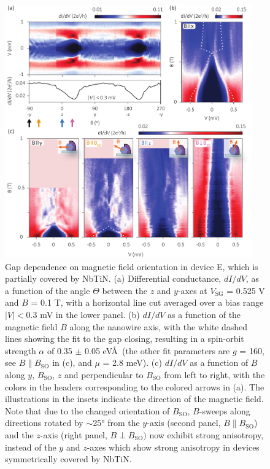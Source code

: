 \begin{figure}[p!]
\centering
\includegraphics[width=0.95\textwidth]{chapter_spinorbit/figures/SFig6_Bsweeps_half.pdf}
\caption{\label{fig:BsweepsHalf}
Gap dependence on magnetic field orientation in device E, which is partially covered by NbTiN.
(a) Differential conductance, $dI/dV$, as a function of the angle $\Theta$ between the $z$ and $y$-axes at $V_{\mathrm{SG}}$ = 0.525 V and $B$ = 0.1 T, with a horizontal line cut averaged over a bias range $|V| < 0.3$ mV in the lower panel.
(b) $dI/dV$ as a function of the magnetic field $B$ along the nanowire axis, with the white dashed lines showing the fit to the gap closing, resulting in a spin-orbit strength $\alpha$ of 0.35 $\pm$ 0.05 eV\AA\ (the other fit parameters are $g$ = 160, see $B \parallel B_{\mathrm{SO}}$ in (c), and $\mu$ = 2.8 meV).
(c) $dI/dV$ as a function of $B$ along $y$, $B_{\mathrm{SO}}$, $z$ and perpendicular to $B_{\mathrm{SO}}$ from left to right, with the colors in the headers corresponding to the colored arrows in (a).
The illustrations in the insets indicate the direction of the magnetic field.
Note that due to the changed orientation of $B_{\mathrm{SO}}$, $B$-sweeps along directions rotated by $\sim$\ang{25} from the $y$-axis (second panel, $B \parallel B_{\mathrm{SO}}$) and the $z$-axis (right panel, $B \perp B_{\mathrm{SO}})$  now exhibit strong anisotropy, instead of the $y$ and $z$-axes which show strong anisotropy in devices symmetrically covered by NbTiN.
}
\end{figure}

